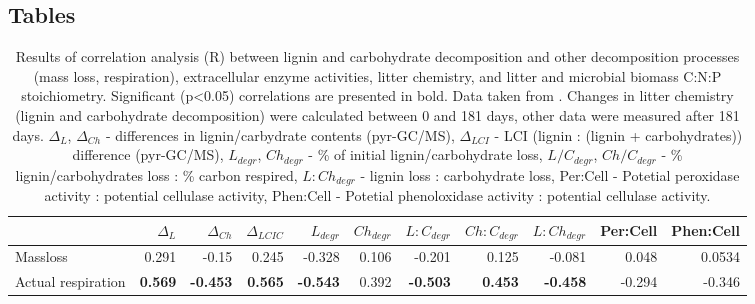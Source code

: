 \documentclass[10pt]{article}
\begin{document}
\begin{flushleft}
\newpage
\section*{Tables}








%


\begin{landscape}

\begin{table}[h!]
\centering
\caption{Results of correlation analysis (R) between lignin and carbohydrate decomposition and other decomposition processes (mass loss, respiration), extracellular enzyme activities, litter chemistry, and litter and microbial biomass C:N:P stoichiometry. Significant (p\textless 0.05) correlations are presented in bold. Data taken from \cite{Mooshammer2011, Leitner2011}. Changes in litter chemistry (lignin and carbohydrate decomposition) were calculated between 0 and 181 days, other data were measured after 181 days. $\Delta _{L}$, $\Delta _{Ch}$ - differences in lignin/carbydrate contents (pyr-GC/MS), $\Delta _{LCI}$ - LCI (lignin : (lignin + carbohydrates)) difference (pyr-GC/MS), $L_{degr}$, $Ch_{degr}$ - \% of initial lignin/carbohydrate loss, $L/C_{degr}$, $Ch/C_{degr}$  - \% lignin/carbohydrates loss : \% carbon respired, $L:Ch_{degr}$ - lignin loss : carbohydrate loss, Per:Cell - Potetial peroxidase activity : potential cellulase activity, Phen:Cell - Potetial phenoloxidase activity : potential cellulase activity.} 
\label{corrtable}
{\small
\begin{tabular}{lrrrrrrrrrr}
  \hline
 & $\Delta _{L}$ & $\Delta _{Ch}$ & $\Delta _{LCIC}$ & $L_{degr}$ & $Ch_{degr}$ & $L:C_{degr}$ & $Ch:C_{degr}$ & $L:Ch_{degr}$ & Per:Cell & Phen:Cell \\ 
  \hline
Massloss & 0.291 & -0.15 & 0.245 & -0.328 & 0.106 & -0.201 & 0.125 & -0.081 & 0.048 & 0.0534 \\ 
  Actual respiration & \textbf{ 0.569 } & \textbf{ -0.453 } & \textbf{ 0.565 } & \textbf{ -0.543 } & 0.392 & \textbf{ -0.503 } & \textbf{ 0.453 } & \textbf{ -0.458 } & -0.294 & -0.346 \\ 

\end{tabular}}
\end{table}
\end{landscape}
\end{flushleft}
\end{document}
